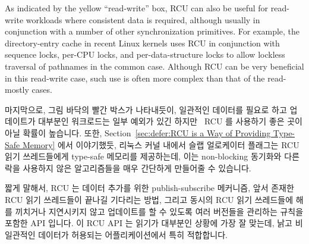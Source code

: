 As indicated by the yellow ``read-write'' box, RCU can also be useful
for read-write
workloads where consistent data is required, although usually in
conjunction with a number of other synchronization primitives.
For example, the directory-entry cache in recent Linux kernels uses RCU in
conjunction with sequence locks, per-CPU locks, and per-data-structure
locks to allow lockless traversal of pathnames in the common case.
Although RCU can be very beneficial in this read-write case, such
use is often more complex than that of the read-mostly cases.
\fi

마지막으로, 그림 바닥의 빨간 박스가 나타내듯이, 일관적인 데이터를 필요로 하고
업데이트가 대부분인 워크로드는 일부 예외가 있긴
하지만~\cite{MathieuDesnoyers2012URCU} RCU 를 사용하기 좋은 곳이 아닐 확률이
높습니다.
또한,
Section~\ref{sec:defer:RCU is a Way of Providing Type-Safe Memory} 에서
이야기했듯, 리눅스 커널 내에서  슬랩 얼로케이터
플래그는 RCU 읽기 쓰레드들에게 type-safe 메모리를 제공하는데, 이는 non-blocking
동기화와 다른 락을 사용하지 않은 알고리즘들을 매우 간단하게 만들어줄 수
있습니다.

짧게 말해서, RCU 는 데이터 추가를 위한 publish-subscribe 메커니즘, 앞서 존재한
RCU 읽기 쓰레드들이 끝나길 기다리는 방법, 그리고 동시의 RCU 읽기 쓰레드들에
해를 끼치거나 지연시키지 않고 업데이트를 할 수 있도록 여러 버전들을 관리하는
규칙을 포함한 API 입니다.
이 RCU API 는 읽기가 대부분인 상황에 가장 잘 맞는데, 낡고 비일관적인 데이터가
허용되는 어플리케이션에서 특히 적합합니다.

%
